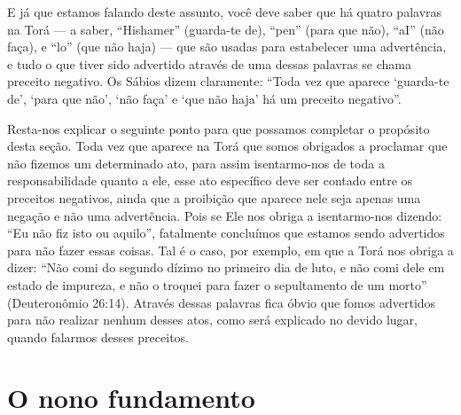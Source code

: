 E já que estamos falando deste assunto, você deve saber que há quatro
palavras na Torá --- a saber, ``Hishamer'' (guarda-te de), ``pen''
(para que não), ``aI'' (não faça), e ``lo'' (que não haja) --- que são
usadas para estabelecer uma advertência, e tudo o que tiver sido
advertido através de uma dessas palavras se chama preceito negativo. Os
Sábios dizem claramente: ``Toda vez que aparece `guarda-te de', `para
que não', `não faça' e `que não haja' há um preceito negativo''.

Resta-nos explicar o seguinte ponto para que possamos completar o
propósito desta seção. Toda vez que aparece na Torá que somos obrigados
a proclamar que não fizemos um determinado ato, para assim isentarmo-nos
de toda a responsabilidade quanto a ele, esse ato específico deve ser
contado entre os preceitos negativos, ainda que a proibição que aparece
nele seja apenas uma negação e não uma advertência. Pois se Ele nos
obriga a isentarmo-nos dizendo: ``Eu não fiz isto ou aquilo'',
fatalmente concluímos que estamos sendo advertidos para não fazer essas
coisas. Tal é o caso, por exemplo, em que a Torá nos obriga a dizer:
``Não comi do segundo dízimo no primeiro dia de luto, e não comi dele em
estado de impureza, e não o troquei para fazer o sepultamento de um
morto'' (Deuteronômio 26:14). Através dessas palavras fica óbvio que
fomos advertidos para não realizar nenhum desses atos, como será
explicado no devido lugar, quando falarmos desses preceitos.

\chapter*{O nono fundamento}

